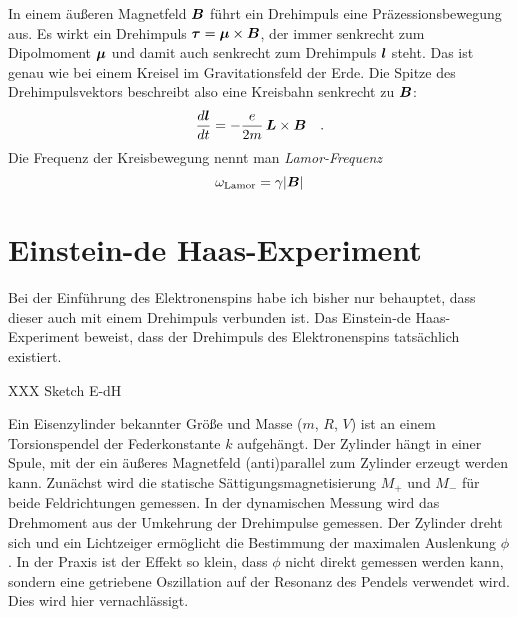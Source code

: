 In einem äußeren Magnetfeld $\boldsymbol{B}$ führt ein Drehimpuls eine Präzessionsbewegung aus. Es wirkt ein Drehimpuls $\boldsymbol{\tau} = \boldsymbol{\mu} \times \boldsymbol{B}$, der immer senkrecht zum Dipolmoment $\boldsymbol{\mu}$ und damit auch senkrecht zum Drehimpuls $\boldsymbol{l}$ steht. Das ist genau wie bei einem Kreisel im Gravitationsfeld der Erde. Die Spitze des Drehimpulsvektors beschreibt also eine Kreisbahn senkrecht zu $\boldsymbol{B}$:
\begin{equation}
    \frac{d \boldsymbol{l}}{dt} = - \frac{e}{2m} \, \boldsymbol{L} \times \boldsymbol{B}  \quad .
\end{equation}
Die Frequenz der Kreisbewegung nennt man \emph{Lamor-Frequenz}
\begin{equation}
    \omega_\text{Lamor} = \gamma | \boldsymbol{B} |
\end{equation}


\section{Einstein-de Haas-Experiment}


Bei der Einführung des Elektronenspins habe ich bisher nur behauptet, dass dieser auch mit einem Drehimpuls verbunden ist. Das Einstein-de Haas-Experiment beweist, dass der Drehimpuls des Elektronenspins tatsächlich existiert.

\begin{marginfigure}
    \caption{XXX Sketch E-dH}
\end{marginfigure}

Ein Eisenzylinder bekannter Größe und Masse ($m$, $R$, $V$) ist an einem Torsionspendel der Federkonstante $k$ aufgehängt. Der Zylinder hängt in einer Spule, mit der ein äußeres Magnetfeld (anti)parallel zum Zylinder erzeugt werden kann. Zunächst wird die statische Sättigungsmagnetisierung $M_+$ und $M_-$ für beide Feldrichtungen gemessen. In der dynamischen Messung wird das Drehmoment aus der Umkehrung der Drehimpulse gemessen. Der Zylinder dreht sich und ein Lichtzeiger ermöglicht die Bestimmung der maximalen Auslenkung $\phi$. In der Praxis ist der Effekt so klein, dass $\phi$ nicht direkt gemessen werden kann, sondern eine getriebene Oszillation auf der Resonanz des Pendels verwendet wird. Dies wird hier vernachlässigt. 

